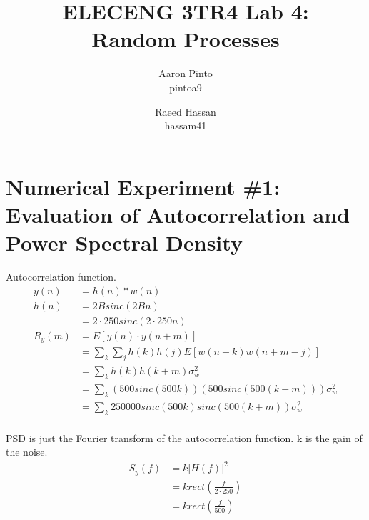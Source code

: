 \documentclass[12pt]{article}
\title{ELECENG 3TR4 Lab 4: \\ Random Processes}
\author{
    Aaron Pinto \\ pintoa9
    \and
    Raeed Hassan \\ hassam41
}
\begin{document}
\maketitle
\clearpage

\section*{Numerical Experiment \#1: Evaluation of Autocorrelation and Power Spectral Density}

Autocorrelation function.
\begin{equation*}
\begin{aligned}
        y(n) &= h(n)\ast w(n) \\
        h(n) &= 2Bsinc(2Bn) \\
        &= 2\cdot 250sinc(2\cdot 250 n) \\
	R_y(m) &= E\left[y(n)\cdot y(n+m)\right] \\
        &= \sum_k\sum_j h(k)h(j)E[w(n-k)w(n+m-j)] \\
	&= \sum_k h(k)h(k+m)\sigma_w^2 \\
        &= \sum_k (500sinc(500k))(500sinc(500(k+m)))\sigma_w^2 \\
        &= \sum_k 250000sinc(500k)sinc(500(k+m))\sigma_w^2 \\
\end{aligned}
\end{equation*}

PSD is just the Fourier transform of the autocorrelation function. k is the gain of the noise.
\begin{equation*}
\begin{aligned}
        S_y(f) &= k \left | H(f) \right |^2 \\
        &= k rect(\frac{f}{2\cdot 250}) \\
        &= k rect(\frac{f}{500}) \\
\end{aligned}
\end{equation*}

\end{document}
